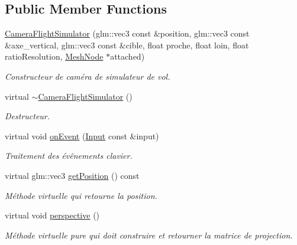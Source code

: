 \subsection*{Public Member Functions}
\begin{DoxyCompactItemize}
\item 
\hypertarget{classCameraFlightSimulator_a13b192b01617281f3dcf9b7acb8e0d44}{\hyperlink{classCameraFlightSimulator_a13b192b01617281f3dcf9b7acb8e0d44}{Camera\+Flight\+Simulator} (glm\+::vec3 const \&position, glm\+::vec3 const \&axe\+\_\+vertical, glm\+::vec3 const \&cible, float proche, float loin, float ratio\+Resolution, \hyperlink{classMeshNode}{Mesh\+Node} $\ast$attached)}\label{classCameraFlightSimulator_a13b192b01617281f3dcf9b7acb8e0d44}

\begin{DoxyCompactList}\small\item\em Constructeur de caméra de simulateur de vol. \end{DoxyCompactList}\item 
\hypertarget{classCameraFlightSimulator_aa83f01c1f64fd6fbf56c341866cb62f8}{virtual \hyperlink{classCameraFlightSimulator_aa83f01c1f64fd6fbf56c341866cb62f8}{$\sim$\+Camera\+Flight\+Simulator} ()}\label{classCameraFlightSimulator_aa83f01c1f64fd6fbf56c341866cb62f8}

\begin{DoxyCompactList}\small\item\em Destructeur. \end{DoxyCompactList}\item 
\hypertarget{classCameraFlightSimulator_ae8ea1ed382e1dfdde4f53ad654c503f5}{virtual void \hyperlink{classCameraFlightSimulator_ae8ea1ed382e1dfdde4f53ad654c503f5}{on\+Event} (\hyperlink{classInput}{Input} const \&input)}\label{classCameraFlightSimulator_ae8ea1ed382e1dfdde4f53ad654c503f5}

\begin{DoxyCompactList}\small\item\em Traitement des évênements clavier. \end{DoxyCompactList}\item 
\hypertarget{classCameraFlightSimulator_ab624dcd6b9110c82980ec2d04786da6d}{virtual glm\+::vec3 \hyperlink{classCameraFlightSimulator_ab624dcd6b9110c82980ec2d04786da6d}{get\+Position} () const }\label{classCameraFlightSimulator_ab624dcd6b9110c82980ec2d04786da6d}

\begin{DoxyCompactList}\small\item\em Méthode virtuelle qui retourne la position. \end{DoxyCompactList}\item 
\hypertarget{classCameraFlightSimulator_a70d900c0f14c3193b9af612ad8f48249}{virtual void \hyperlink{classCameraFlightSimulator_a70d900c0f14c3193b9af612ad8f48249}{perspective} ()}\label{classCameraFlightSimulator_a70d900c0f14c3193b9af612ad8f48249}

\begin{DoxyCompactList}\small\item\em Méthode virtuelle pure qui doit construire et retourner la matrice de projection. \end{DoxyCompactList}\end{DoxyCompactItemize}
